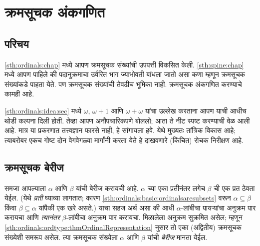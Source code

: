 \chapter{क्रमसूचक अंकगणित}\label{sth:ord-arithmetic:chap}




\section{परिचय}\label{sth:ord-arithmetic:intro:sec}

\ref{sth:ordinals:chap} मध्ये आपण क्रमसूचक संख्यांची उपपत्ती विकसित केली. \ref{sth:spine:chap} मध्ये आपण पाहिले की पदानुक्रमाचा उर्वरित भाग ज्याभोवती बांधला जातो असा कणा म्हणून क्रमसूचक संख्यांकडे पाहता येते. पण क्रमसूचक संख्यांची तेवढीच भूमिका नाही. क्रमसूचक अंकगणित करण्याचे कामही आहे.

\ref{sth:ordinals:idea:sec} मध्ये $\omega$, $\omega+1$ आणि $\omega+\omega$ यांचा उल्लेख करताना आपण याची आधीच थोडी कल्पना दिली होती. तेव्हा आपण अनौपचारिकपणे बोललो; आता ते नीट स्पष्ट करण्याची वेळ आली आहे. मात्र या प्रकरणात तत्त्वज्ञान फारसे नाही, हे सांगायला हवे. येथे मुख्यतः तांत्रिक विकास आहे; त्याबरोबर एकच गोष्ट दोन वेगवेगळ्या मार्गांनी करता येते हे दाखवणारे (किंचित) रोचक निरीक्षण आहे.







\section{क्रमसूचक बेरीज}\label{sth:ord-arithmetic:add:sec}

समजा आपल्याला $\alpha$ आणि $\beta$ यांची बेरीज करायची आहे. $\alpha$ च्या एका {प्रतीनंतर} लगेच $\beta$ ची एक प्रत ठेवता येईल. (येथे \emph{प्रती} घ्याव्या लागतात; कारण \ref{sth:ordinals:basic:ordinalsaresubsets} वरून $\alpha \subseteq \beta$ किंवा $\beta \subseteq \alpha$ यांपैकी एक खरे असते.) याचा सहज अर्थ असा की आधी $\alpha$-लांबीचा पायऱ्यांचा अनुक्रम पार करायचा आणि \emph{त्यानंतर} $\beta$-लांबीचा अनुक्रम पार करायचा. मिळालेला अनुक्रम सुक्रमित असेल; म्हणून \ref{sth:ordinals:ordtype:thmOrdinalRepresentation} नुसार तो एका (अद्वितीय) क्रमसूचक संख्येशी समरूप असेल. त्या क्रमसूचक संख्येला $\alpha$ आणि $\beta$ यांची \emph{बेरीज} मानता येईल.

